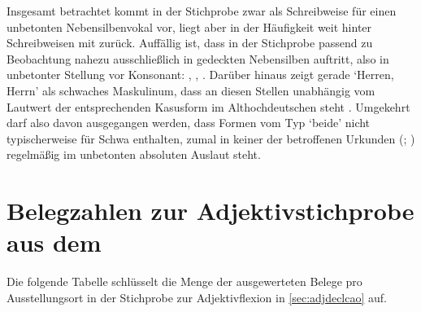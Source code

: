Insgesamt betrachtet kommt  in der Stichprobe zwar als Schreibweise für
einen unbetonten Nebensilbenvokal vor, liegt aber in der Häufigkeit weit hinter
Schreibweisen mit  zurück. Auffällig ist, dass  in der Stichprobe
passend zu  Beobachtung nahezu
ausschließlich in gedeckten Nebensilben auftritt, also in unbetonter Stellung
vor Konsonant: , , .
Darüber hinaus zeigt gerade  `Herren, Herrn' als schwaches
Maskulinum, dass  an diesen Stellen unabhängig vom Lautwert der
entsprechenden Kasusform im Althochdeutschen steht
\autocite[vgl.][282--283]{braune2018}. Umgekehrt darf also davon ausgegangen
werden, dass Formen vom Typ  `beide' nicht typischerweise
 für Schwa enthalten, zumal in keiner der betroffenen Urkunden
(\cites(Nrn.~81, 190)[124,18--33; 205,30--45]{cao1};
\cites(Nr.~N~230)[175,1--33]{cao5}) regelmäßig  im unbetonten absoluten
Auslaut steht.

\chapter{Belegzahlen zur Adjektivstichprobe aus dem }
\label{sec:caoadjquanttab}

Die folgende Tabelle schlüsselt die Menge der ausgewerteten Belege pro
Ausstellungsort in der Stichprobe zur Adjektivflexion in \cref{sec:adjdeclcao}
auf.



